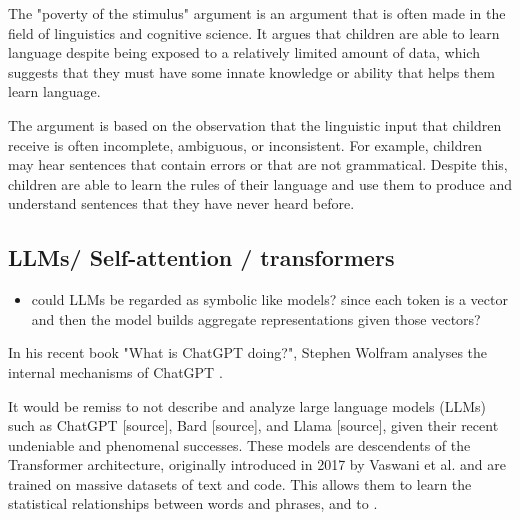 The "poverty of the stimulus" argument is an argument that is often made in the field of linguistics and cognitive science. It argues that children are able to learn language despite being exposed to a relatively limited amount of data, which suggests that they must have some innate knowledge or ability that helps them learn language.

The argument is based on the observation that the linguistic input that children receive is often incomplete, ambiguous, or inconsistent. For example, children may hear sentences that contain errors or that are not grammatical. Despite this, children are able to learn the rules of their language and use them to produce and understand sentences that they have never heard before.


















\subsection{LLMs/ Self-attention / transformers}

\begin{itemize}
    \item could LLMs be regarded as symbolic like models? since each token is a vector and then the model builds aggregate representations given those vectors?
\end{itemize}

In his recent book "What is ChatGPT doing?", Stephen Wolfram analyses the internal mechanisms of ChatGPT \cite{wolfram2023chatgpt}.

It would be remiss to not describe and analyze large language models (LLMs) such as ChatGPT [source], Bard [source], and Llama [source], given their recent undeniable and phenomenal successes. These models are descendents of the Transformer architecture, originally introduced in 2017 by Vaswani et al. \cite{Vaswani_Shazeer_Parmar_Uszkoreit_Jones_Gomez_Kaiser_Polosukhin_2017} and are trained on massive datasets of text and code. This allows them to learn the statistical relationships between words and phrases, and to .

